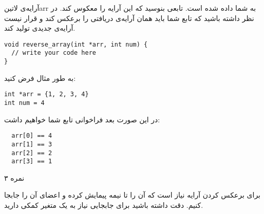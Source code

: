 
آرایه‌ی ‌لاتین{arr} به شما داده شده است. تابعی بنوسید که این آرایه را معکوس کند.
در نظر داشته باشید که تابع شما باید همان آرایه‌ی دریافتی را برعکس کند و قرار نیست آرایه‌ی جدیدی تولید کند.

\begin{latin}
\begin{verbatim}
void reverse_array(int *arr, int num) {
  // write your code here
}
\end{verbatim}
\end{latin}

به طور مثال فرض کنید:

\begin{latin}
\begin{verbatim}
int *arr = {1, 2, 3, 4}
int num = 4
\end{verbatim}
\end{latin}

در این صورت بعد فراخوانی تابع شما خواهیم داشت:

\begin{latin}
\begin{verbatim}
  arr[0] == 4
  arr[1] == 3
  arr[2] == 2
  arr[3] == 1
\end{verbatim}
\end{latin}

۳ نمره



برای برعکس کردن آرایه نیاز است که آن را تا نیمه پیمایش کرده و اعضای آن را جابجا کنیم.
دقت داشته باشید برای جابجایی نیاز به یک متغیر کمکی دارید.

\begin{latin}
  \inputminted{c}{./reverse-array/main.c}
\end{latin}

